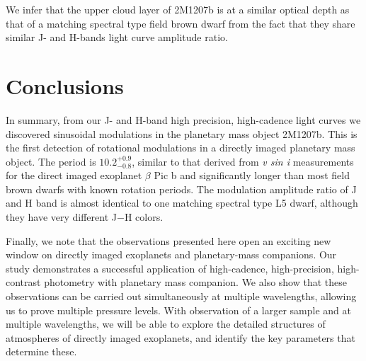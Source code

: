 \documentclass[apj]{emulateapj}
\newcommand{\bpic}{$\beta$ Pic}
\begin{document}
We infer that the upper cloud layer of 2M1207b is at a similar optical
depth as that of a matching spectral type field brown dwarf from the fact
that they share similar J- and H-bands light curve amplitude ratio.


\section{Conclusions}
In summary, from our J- and H-band high precision, high-cadence
light curves we discovered sinusoidal modulations in the planetary mass
object 2M1207b. This is the first detection of rotational modulations
in a directly imaged planetary mass object.  The period is
$10.2^{+0.9}_{-0.8}$,  similar to that derived from {\em v sin i}
measurements for the direct imaged exoplanet \bpic{} b and
significantly longer than most field brown dwarfs with known rotation
periods. The modulation amplitude ratio of J and H band is almost
identical to one matching spectral type L5 dwarf, although they have
very different J$-$H colors.

Finally, we note that the observations presented here open an exciting
new window on directly imaged exoplanets and planetary-mass
companions. Our study demonstrates a successful application of high-cadence,
high-precision, high-contrast photometry with planetary mass
companion. We also show that these observations can be carried out simultaneously
at multiple wavelengths, allowing us to prove multiple pressure
levels. With observation of a larger sample and at multiple wavelengths, we will be
able to explore the detailed structures of atmospheres of directly
imaged exoplanets, and identify the key parameters that determine these.



\end{document}

